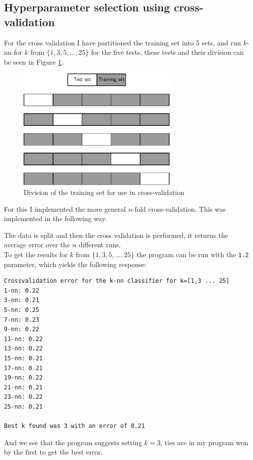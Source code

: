 \documentclass[a4paper]{article}
\begin{document}
\subsection{Hyperparameter selection using cross-validation}
For the cross validation I have partitioned the training set into 5 sets, and run $k$-nn for $k$ from $\{1,3,5,...,25\}$ for the five tests, these tests and their division can be seen in Figure \ref{12}.
\begin{figure}[H]
  \centering
  \includegraphics[width=0.7\textwidth]{./12.pdf}
  \caption{Division of the training set for use in cross-validation}
  \label{12}
\end{figure}
For this I implemented the more general $n$-fold cross-validation. This was implemented in the following way.

The data is split and then the cross validation is performed, it returns the average error over the $n$ different runs.\\
To get the results for $k$ from $\{1,3,5,...,25\}$ the program can be run with the \texttt{1.2} parameter, which yields the following response:
\begin{lstlisting}
Crossvalidation error for the k-nn classifier for k=[1,3 ... 25]
1-nn: 0.22
3-nn: 0.21
5-nn: 0.25
7-nn: 0.23
9-nn: 0.22
11-nn: 0.22
13-nn: 0.22
15-nn: 0.21
17-nn: 0.21
19-nn: 0.22
21-nn: 0.21
23-nn: 0.22
25-nn: 0.21

Best k found was 3 with an error of 0.21
\end{lstlisting}
And we see that the program suggests setting $k=3$, ties are in my program won by the first to get the best error.
\end{document}
